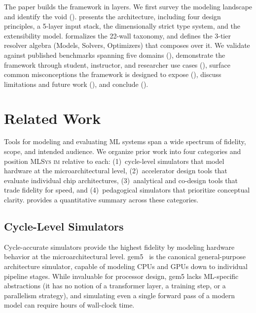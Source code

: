 \documentclass[10pt,twocolumn]{article}
\newcommand{\mlsysim}{\mbox{\textsc{MLSys}\,\textperiodcentered\,\textsc{im}}\xspace}
\begin{document}
The paper builds the framework in layers. We first survey the modeling landscape and identify the void ().  presents the architecture, including four design principles, a 5-layer input stack, the dimensionally strict type system, and the extensibility model.  formalizes the 22-wall taxonomy, and  defines the 3-tier resolver algebra (Models, Solvers, Optimizers) that composes over it. We validate against published benchmarks spanning five domains (), demonstrate the framework through student, instructor, and researcher use cases (), surface common misconceptions the framework is designed to expose (), discuss limitations and future work (), and conclude ().

\section{Related Work}
\label{sec:related}

Tools for modeling and evaluating ML systems span a wide spectrum of fidelity, scope, and intended audience. We organize prior work into four categories and position \mlsysim relative to each: (1)~cycle-level simulators that model hardware at the microarchitectural level, (2)~accelerator design tools that evaluate individual chip architectures, (3)~analytical and co-design tools that trade fidelity for speed, and (4)~pedagogical simulators that prioritize conceptual clarity.  provides a quantitative summary across these categories.

\subsection{Cycle-Level Simulators}

Cycle-accurate simulators provide the highest fidelity by modeling hardware behavior at the microarchitectural level. gem5~\citep{binkert2011} is the canonical general-purpose architecture simulator, capable of modeling CPUs and GPUs down to individual pipeline stages. While invaluable for processor design, gem5 lacks ML-specific abstractions (it has no notion of a transformer layer, a training step, or a parallelism strategy), and simulating even a single forward pass of a modern model can require hours of wall-clock time.
\end{document}
